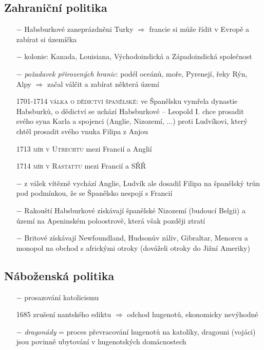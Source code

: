 \documentclass{article}
\begin{document}
\subsection*{Zahraniční politika}
\begin{itemize}
    \vspace{-0.5em}
    \setlength\itemsep{0.15em}
    \item[$-$] Habsburkové zaneprázdněni Turky $\Rightarrow$ francie si může řídit v Evropě a zabírat si územíčka
    \item[$-$] kolonie: Kanada, Louisiana, Východoindická a Západoindická společnost
    \item[$-$] \textit{požadavek přirozených hranic}: podél oceánů, moře, Pyrenejí, řeky Rýn, Alpy $\Rightarrow$ začal válčit a zabírat některá území
    \item[1701-1714] \textsc{válka o dědictví španělské}: ve Španělsku vymřela dynastie Habsburků, o dědictví se uchází Habsburkové -- Leopold I. chce prosadit svého syna Karla a spojenci (Anglie, Nizozemí, ...) proti Ludvíkovi, který chtěl prosadit svého vnuka Filipa z Anjou
    \item[1713] \textsc{mír v Utrechtu} mezi Francií a Anglií
    \item[1714] \textsc{mír v Rastattu} mezi Francií a SŘŘ
    \item[$-$] z válek vítězně vychází Anglie, Ludvík ale dosadil Filipa na španělský trůn pod podmínkou, že se Španělsko nespojí s Francií
    \item[$-$] Rakouští Habsburkové získávají španělské Nizozemí (budoucí Belgii) a území na Apeninském poloostrově, která však později ztratí
    \item[$-$] Britové získávají Newfoundland, Hudsonův záliv, Gibraltar, Menorcu a monopol na obchod s africkými otroky (dováželi otroky do Jižní Ameriky)
\end{itemize}


\subsection*{Náboženská politika}
\begin{itemize}
    \vspace{-0.5em}
    \setlength\itemsep{0.15em}
    \item[$-$] prosazování katolicismu
    \item[1685] zrušení nantského ediktu $\Rightarrow$ odchod hugenotů, ekonomicky nevýhodné
    \item[$-$] \textit{dragonády} = proces převracování hugenotů na katolíky, dragouni (vojáci) jsou povinně ubytování v hugenotských domácnostech
\end{itemize}
\end{document}
